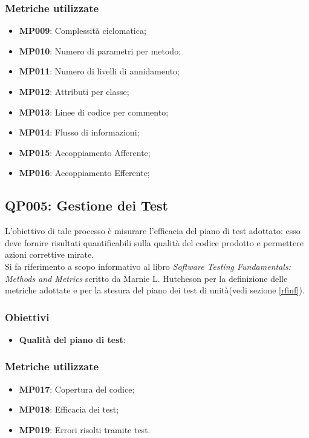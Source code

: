 \subsubsection{Metriche utilizzate}

\begin{itemize}
	\item \textbf{MP009}: Complessità ciclomatica;
	\item \textbf{MP010}: Numero di parametri per metodo;
	\item \textbf{MP011}: Numero di livelli di annidamento;
	\item \textbf{MP012}: Attributi per classe;
	\item \textbf{MP013}: Linee di codice per commento;
	\item \textbf{MP014}: Flusso di informazioni;
	\item \textbf{MP015}: Accoppiamento Afferente;
	\item \textbf{MP016}: Accoppiamento Efferente;

	
\end{itemize}

\subsection{QP005: Gestione dei Test}\label{test}
L'obiettivo di tale processo è misurare l'efficacia del piano di test adottato: esso deve fornire risultati quantificabili sulla qualità del codice prodotto e permettere azioni correttive mirate.\\
Si fa riferimento a scopo informativo al libro \textit{Software Testing Fundamentals: Methods and Metrics} scritto da Marnie L. Hutcheson per la definizione delle metriche adottate e per la stesura del piano dei test di unità(vedi sezione \ref{rfinf}).
\subsubsection{Obiettivi}
\begin{itemize}
	\item \textbf{Qualità del piano di test}: 
\end{itemize}
\subsubsection{Metriche utilizzate}
\begin{itemize}
	\item \textbf{MP017}: Copertura del codice;
	\item \textbf{MP018}: Efficacia dei test;
	\item \textbf{MP019}: Errori risolti tramite test.
\end{itemize}


